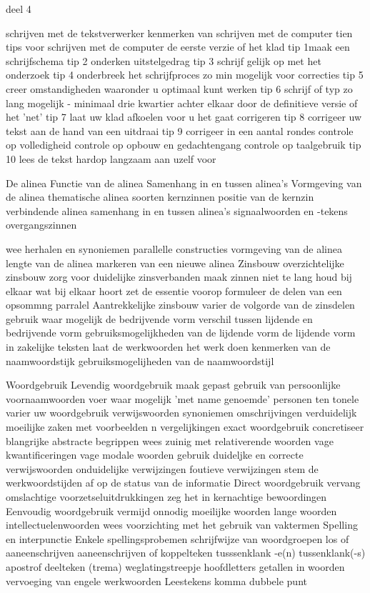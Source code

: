 deel 4

schrijven met de tekstverwerker
kenmerken van schrijven met de computer
tien tips voor schrijven met de computer
de eerste verzie of het klad
tip 1maak een schrijfschema
tip 2 onderken uitstelgedrag
tip 3 schrijf gelijk op met het onderzoek
tip 4 onderbreek het schrijfproces zo min mogelijk voor correcties
tip 5 creer omstandigheden waaronder u optimaal kunt werken
tip 6 schrijf of typ zo lang mogelijk - minimaal drie kwartier achter elkaar door
de definitieve versie of het 'net'
tip 7 laat uw klad afkoelen voor u het gaat corrigeren
tip 8 corrigeer uw tekst aan de hand van een uitdraai
tip 9 corrigeer in  een aantal rondes
controle op volledigheid
controle op opbouw en gedachtengang
controle op taalgebruik
tip 10 lees de tekst  hardop langzaam aan uzelf voor


De alinea
Functie van de alinea
Samenhang in en tussen alinea's
Vormgeving van de alinea
thematische alinea
soorten kernzinnen
positie van de kernzin
verbindende alinea
samenhang in en tussen alinea's
signaalwoorden en -tekens
overgangszinnen

wee
herhalen en synoniemen
parallelle constructies
vormgeving van de alinea
lengte van de alinea
markeren van een nieuwe alinea
Zinsbouw
overzichtelijke zinsbouw
zorg voor duidelijke zinsverbanden
maak zinnen niet te lang
houd bij elkaar wat bij elkaar hoort
zet de essentie voorop
formuleer de delen van een opsommng parralel
Aantrekkelijke zinsbouw
varier de volgorde van de zinsdelen
gebruik waar mogelijk de bedrijvende vorm
verschil tussen lijdende en bedrijvende vorm
gebruiksmogelijkheden van de lijdende vorm
de lijdende vorm in zakelijke teksten
laat de werkwoorden het werk doen
kenmerken van de naamwoordstijk
gebruiksmogelijheden van de naamwoordstijl

Woordgebruik
Levendig woordgebruik
maak gepast gebruik van persoonlijke voornaamwoorden
voer waar mogelijk 'met name genoemde' personen ten tonele
varier uw woordgebruik
verwijswoorden
synoniemen
omschrijvingen
verduidelijk moeilijke zaken met voorbeelden n vergelijkingen
exact woordgebruik
concretiseer blangrijke abstracte begrippen
wees zuinig met relativerende woorden
vage kwantificeringen
vage modale woorden
gebruik duideljke en correcte verwijswoorden
onduidelijke verwijzingen
foutieve verwijzingen
stem de werkwoordstijden af op de status van de informatie
Direct woordgebruik
vervang omslachtige voorzetseluitdrukkingen
zeg het in kernachtige bewoordingen
Eenvoudig woordgebruik
vermijd onnodig moeilijke woorden
lange woorden
intellectuelenwoorden
wees voorzichting met het gebruik van vaktermen
Spelling en interpunctie
Enkele spellingsprobemen
schrijfwijze van woordgroepen
los of aaneenschrijven
aaneenschrijven of koppelteken
tusssenklank -e(n)
tussenklank(-s)
apostrof
deelteken (trema)
weglatingstreepje
hoofdletters
getallen in woorden
vervoeging van engele werkwoorden
Leestekens
komma
dubbele punt









